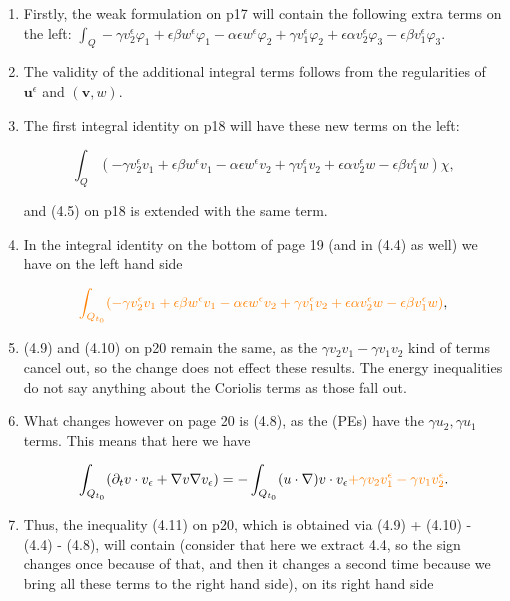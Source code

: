 \documentclass[11pt]{article}
\begin{document}
\begin{enumerate}

  \item Firstly, the weak formulation on p17 will contain the following extra terms on the left: $ \int_Q  - \gamma v_2^\epsilon \varphi_1 + \epsilon \beta w^\epsilon \varphi_1 - \alpha \epsilon w^\epsilon \varphi_2 + \gamma v_1^\epsilon \varphi_2 + \epsilon \alpha v^\epsilon_2 \varphi_3 - \epsilon \beta v^\epsilon_1 \varphi_3.$
  
  \item The validity of the additional integral terms follows from the regularities of $\mathbf{u}^\epsilon$ and $(\mathbf{v},w).$
  
  \item The first integral identity on p18 will have these new terms on the left:
  
    $$ \int_Q  ( - \gamma v_2^\epsilon v_1 + \epsilon \beta w^\epsilon v_1 - \alpha \epsilon w^\epsilon v_2 + \gamma v_1^\epsilon v_2 + \epsilon \alpha v^\epsilon_2 w - \epsilon \beta v^\epsilon_1 w) \chi ,$$
    
    and (4.5) on p18 is extended with the same term.
    
  \item In the integral identity on the bottom of page 19 (and in (4.4) as well) we have on the left hand side
  
   $$ \textcolor{orange}{\int_{Q_{t_0}}  ( - \gamma v_2^\epsilon v_1 + \epsilon \beta w^\epsilon v_1 - \alpha \epsilon w^\epsilon v_2 + \gamma v_1^\epsilon v_2 + \epsilon \alpha v^\epsilon_2 w - \epsilon \beta v^\epsilon_1 w)} ,$$

  \item (4.9) and (4.10) on p20 remain the same, as the $\gamma v_2 v_1 - \gamma v_1 v_2$ kind of terms cancel out, so the change does not effect these results. The energy inequalities do not say anything about the Coriolis terms as those fall out.
  
  \item What changes however on page 20 is (4.8), as the (PEs) have the $\gamma u_2, \gamma u_1$ terms. This means that here we have
  
  $$ \int_{Q_{t_0}} (\partial_t v \cdot v_\epsilon + \nabla v \nabla v_\epsilon) = - \int_{Q_{t_0}} (u \cdot \nabla) v \cdot v_\epsilon \textcolor{orange}{ + \gamma v_2 v_1^\epsilon - \gamma v_1 v_2^\epsilon}. $$
  
  \item Thus, the inequality (4.11) on p20, which is obtained via (4.9) + (4.10) - (4.4) - (4.8), will contain (consider that here we extract 4.4, so the sign changes once because of that, and then it changes a second time because we bring all these terms to the right hand side), on its right hand side
  

\end{enumerate}
\end{document}
